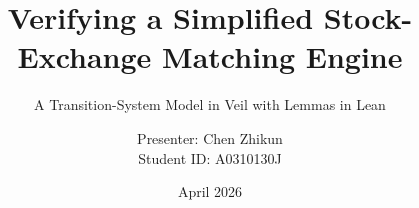 \documentclass[xcolor=dvipsnames,aspectratio=169]{beamer}
\title{Verifying a Simplified Stock-Exchange Matching Engine}
\subtitle{A Transition-System Model in Veil with Lemmas in Lean}
\author{Presenter: Chen Zhikun \\ Student ID: A0310130J}
\date{April 2026}
\begin{document}
\begin{frame}
  \titlepage
\end{frame}










\end{document}
